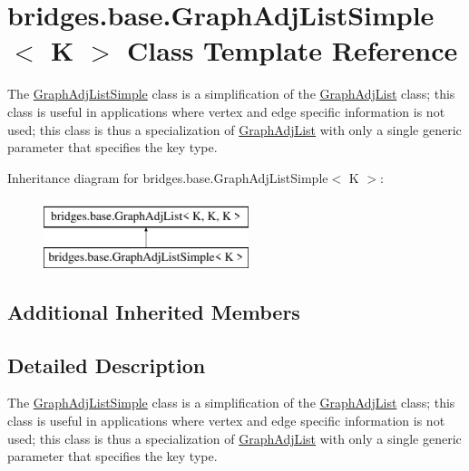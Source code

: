 \hypertarget{classbridges_1_1base_1_1_graph_adj_list_simple}{}\section{bridges.\+base.\+Graph\+Adj\+List\+Simple$<$ K $>$ Class Template Reference}
\label{classbridges_1_1base_1_1_graph_adj_list_simple}


The \mbox{\hyperlink{classbridges_1_1base_1_1_graph_adj_list_simple}{Graph\+Adj\+List\+Simple}} class is a simplification of the \mbox{\hyperlink{classbridges_1_1base_1_1_graph_adj_list}{Graph\+Adj\+List}} class; this class is useful in applications where vertex and edge specific information is not used; this class is thus a specialization of \mbox{\hyperlink{classbridges_1_1base_1_1_graph_adj_list}{Graph\+Adj\+List}} with only a single generic parameter that specifies the key type.  


Inheritance diagram for bridges.\+base.\+Graph\+Adj\+List\+Simple$<$ K $>$\+:\begin{figure}[H]
\begin{center}
\leavevmode
\includegraphics[height=2.000000cm]{classbridges_1_1base_1_1_graph_adj_list_simple}
\end{center}
\end{figure}
\subsection*{Additional Inherited Members}


\subsection{Detailed Description}
The \mbox{\hyperlink{classbridges_1_1base_1_1_graph_adj_list_simple}{Graph\+Adj\+List\+Simple}} class is a simplification of the \mbox{\hyperlink{classbridges_1_1base_1_1_graph_adj_list}{Graph\+Adj\+List}} class; this class is useful in applications where vertex and edge specific information is not used; this class is thus a specialization of \mbox{\hyperlink{classbridges_1_1base_1_1_graph_adj_list}{Graph\+Adj\+List}} with only a single generic parameter that specifies the key type. 

